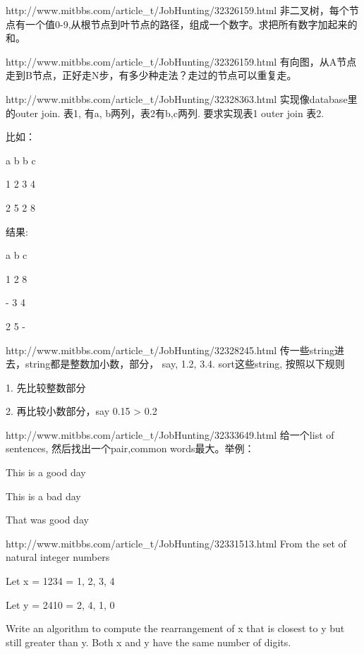 \documentclass[a4paper]{article}
\begin{document}
\begin{CJK}{UTF8}{gbsn}
\begin{enumerate}
\begin{Q}[Twitter]{http://www.mitbbs.com/article_t/JobHunting/32326159.html}
非二叉树，每个节点有一个值0-9,从根节点到叶节点的路径，组成一个数字。求把所有数字加起来的和。
\end{Q}

\begin{Q}[Twitter]{http://www.mitbbs.com/article_t/JobHunting/32326159.html}
有向图，从A节点走到B节点，正好走N步，有多少种走法？走过的节点可以重复走。
\end{Q}

\begin{Q}[Google]{http://www.mitbbs.com/article_t/JobHunting/32328363.html}
实现像database里的outer join. 表1, 有a, b两列，表2有b,c两列. 要求实现表1 outer join 表2.

比如：

a b    b c

1 2    3 4

2 5    2 8

结果:

a b c

1 2 8

- 3 4

2 5 -
\end{Q}

\begin{Q}[Google]{http://www.mitbbs.com/article_t/JobHunting/32328245.html}
传一些string进去，string都是整数加小数，部分， say, 1.2, 3.4. sort这些string, 按照以下规则

1. 先比较整数部分

2. 再比较小数部分，say 0.15 > 0.2

\end{Q}

\begin{Q}[Google]{http://www.mitbbs.com/article_t/JobHunting/32333649.html}
给一个list of sentences, 然后找出一个pair,common words最大。举例：

This is a good day

This is a bad day

That was good day
\end{Q}

\begin{Q}[Google]{http://www.mitbbs.com/article_t/JobHunting/32331513.html}
From the set of natural integer numbers

Let x = 1234 = {1, 2, 3, 4}

Let y = 2410 = {2, 4, 1, 0}

Write an algorithm to compute the rearrangement of x that is closest to y but still greater than y. Both x and y have the same number of digits.
\end{Q}


\end{enumerate}
\end{CJK}
\end{document}
